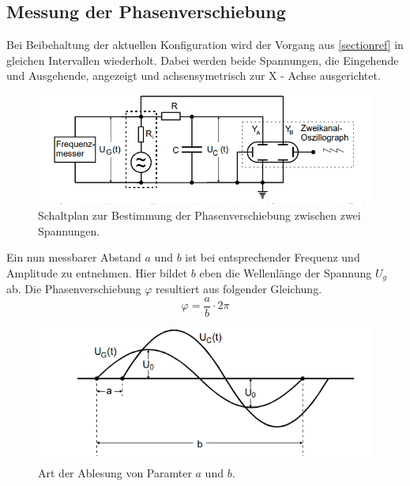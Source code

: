 \subsection{Messung der Phasenverschiebung}
Bei Beibehaltung der aktuellen Konfiguration wird der Vorgang aus \ref{sectionref} in gleichen Intervallen
wiederholt. Dabei werden beide Spannungen, die Eingehende und Ausgehende, angezeigt und achsensymetrisch
zur X - Achse ausgerichtet.\\
\begin{figure}
    \centering
    \includegraphics[width=\textwidth]{bilder/ab.png}
    \caption{Schaltplan zur Bestimmung der Phasenverschiebung zwischen zwei Spannungen.\cite{skript}}
    \label{fig:ab}
\end{figure}
Ein nun messbarer Abstand $a$ und $b$ %
ist bei entsprechender Frequenz und Amplitude zu entnehmen. Hier bildet $b$ eben die Wellenlänge
der Spannung $U_g$ ab. Die Phasenverschiebung $\varphi$ resultiert aus folgender Gleichung.
\begin{equation}
    \varphi= \frac{a}{b} \cdot 2 \pi
\end{equation}

\begin{figure}
    \centering
    \includegraphics[width=\textwidth]{bilder/ab2.png}
    \caption{Art der Ablesung von Paramter $a$ und $b$.\cite{skript}}
    \label{fig:ab}
\end{figure}
